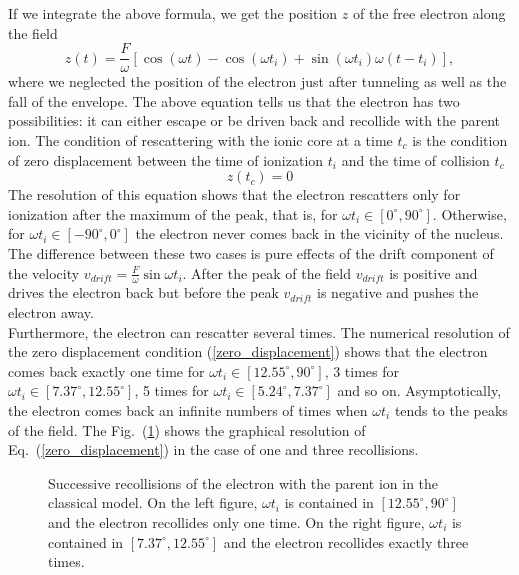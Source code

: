 \documentclass[a4paper]{article}
\begin{document}
\par
If we integrate the above formula, we get the position $z$ of the free electron along the field
\begin{equation}
\label{position_free_motion}
z(t)=\frac{F}{\omega}\left[\cos(\omega t)-\cos(\omega t_{i})+\sin(\omega t_{i})\omega(t-t_{i})\right],
\end{equation}
where we neglected the position of the electron just after tunneling as well as the fall of the envelope.
The above equation tells us that the electron has two possibilities: it can either escape or be driven back and recollide with the parent ion. The condition of rescattering with the ionic core at a time $t_{c}$ is the condition of zero displacement between the time of ionization $t_{i}$ and the time of collision $t_{c}$
\begin{equation}
\label{zero_displacement}
z(t_{c})=0 
\end{equation}
The resolution of this equation shows that the electron rescatters only for ionization after the maximum of the peak, that is, for $\omega t_{i} \in [0^{\circ},90^{\circ}]$. Otherwise, for $\omega t_{i} \in [-90^{\circ},0^{\circ}]$ the electron never comes back in the vicinity of the nucleus. The difference between these two cases is pure effects of the drift component of the velocity $v_{drift}=\frac{F}{\omega}\sin{\omega t_{i}}$. After the peak  of the field $v_{drift}$ is positive and drives the electron back but before the peak $v_{drift}$ is negative and pushes the electron away. \\
Furthermore, the electron can rescatter several times. The numerical resolution of the zero displacement condition (\ref{zero_displacement}) shows that the electron comes back exactly one time for $\omega t_{i} \in [12.55^{\circ},90^{\circ}]$, 3 times for $\omega t_{i} \in [7.37^{\circ},12.55^{\circ}]$, 5 times for $\omega t_{i} \in [5.24^{\circ},7.37^{\circ}]$ and so on. Asymptotically, the electron comes back an infinite numbers of times when $\omega t_{i}$ tends to the peaks of the field. The Fig.~(\ref{successive_recollision}) shows the graphical resolution of Eq.~(\ref{zero_displacement}) in the case of one and three recollisions.
\begin{figure}
\centering
 
 \caption{Successive recollisions of the electron with the parent ion in the classical model. On the left figure, $\omega t_{i}$ is contained in $[12.55^{\circ},90^{\circ}]$ and the electron recollides only one time. On the right figure, $\omega t_{i}$ is contained in $[7.37^{\circ},12.55^{\circ}]$ and the electron recollides exactly three times.}
 \label{successive_recollision} 
\end{figure}
\end{document}
